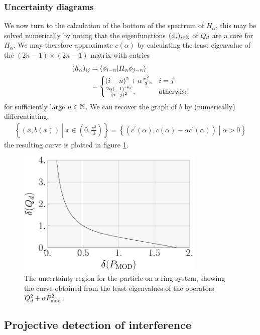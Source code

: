 \subsubsection{Uncertainty diagrams}
We now turn to the calculation of the bottom of the spectrum of $H_\alpha$, this may be solved numerically by noting that the eigenfunctions $(\phi_i)_{i\in\mathbb{Z}}$ of $Q_d$ are a core for $H_\alpha$. We may therefore approximate $c(\alpha)$ by calculating the least eigenvalue of the $(2n-1)\times (2n-1)$ matrix with entries
\begin{align}
  (h_\alpha)_{ij} &= \langle \phi_{i-n}|H_\alpha \phi_{j-n}\rangle\\
                  &= \begin{cases}(i-n)^2 + \alpha\frac{\pi^2}{3},& i = j\\ \frac{2 \alpha(-1)^{i+j}}{(i-j)^2}, & \text{otherwise}\end{cases}
\end{align}
for sufficiently large $n\in\mathbb{N}$. We can recover the graph of $b$ by (numerically) differentiating, 
\begin{align}
  \left\{(x,b(x))\middle|x\in \left(0,\frac{\pi^2}{3}\right)\right\} = \left\{ (c^\prime(\alpha), c(\alpha)-\alpha c^\prime(\alpha))\middle| \alpha > 0\right\}
\end{align}
the resulting curve is plotted in figure \ref{fig:ring-ur}.

\begin{figure}
  \centering
  \includegraphics[width=0.8\textwidth]{ring-ur}
  \caption{The uncertainty region for the particle on a ring system, showing the curve obtained from the least eigenvalues of the operators $Q_d^2 + \alpha P_{\mathrm{mod}}^2$.}
  \label{fig:ring-ur}
\end{figure}

\subsection{Projective detection of interference}


